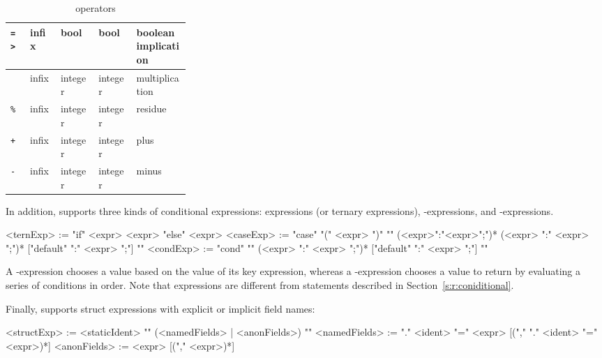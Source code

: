 \begin{table}
\begin{small}
\begin{tabular}{|l|l|l|l|p{0.3\linewidth}|}
    \hline    
    {\tt\verb#=>#}                   & infix   & bool           & bool           & boolean implication\\
    \hline    
    {\tt*}                           & infix   & integer        & integer        & multiplication \\
    \hline    
    {\tt\%}                          & infix   & integer        & integer        & residue \\
    \hline    
    {\tt+}                           & infix   & integer        & integer        & plus \\
    \hline    
    {\tt-}                           & infix   & integer        & integer        & minus \\
    \hline
\end{tabular}
\end{small}
\caption{\tsl operators}\label{t:ops}
\end{table}

In addition, \tsl supports three kinds of conditional expressions: 
 expressions (or ternary expressions), 
-expressions, and -expressions.  

\begin{bnflisting}
<ternExp> := "if" <expr> <expr> "else" <expr>
<caseExp> := "case" "(" <expr> ")" "{" (<expr>":"<expr>";")* 
                 (<expr> ":" <expr> ";")* 
                 ["default" ":" <expr> ";"]
            "}"
<condExp> := "cond" "{"
                  (<expr>    ":" <expr> ";")*
                  ["default" ":" <expr> ";"]
              "}"
\end{bnflisting}

A -expression chooses a value based on the value of its 
key expression, whereas a -expression chooses a value to 
return by evaluating a series of conditions in order.  Note that 
 expressions are different from  statements 
described in Section~\ref{s:r:coniditional}.

Finally, \tsl supports struct expressions with explicit or implicit 
field names:

\begin{bnflisting}
<structExp>   := <staticIdent> "{" 
                     (<namedFields> | <anonFields>) 
                 "}"
<namedFields> := "." <ident> "=" <expr> 
                 [("," "." <ident> "=" <expr>)*]
<anonFields> := <expr> 
                 [("," <expr>)*]
\end{bnflisting}

